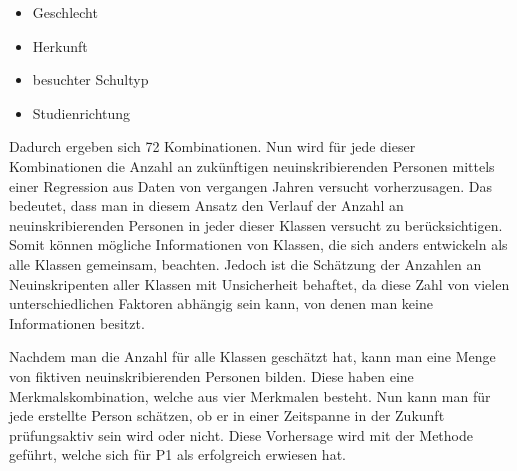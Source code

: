 \begin{itemize}
  \item Geschlecht
  \item Herkunft
  \item besuchter Schultyp
  \item Studienrichtung
\end{itemize}

Dadurch ergeben sich 72 Kombinationen. Nun wird f\"ur jede dieser Kombinationen die Anzahl an zuk\"unftigen neuinskribierenden Personen mittels einer Regression aus Daten von
vergangen Jahren versucht vorherzusagen. Das bedeutet, dass man in diesem Ansatz den Verlauf der Anzahl an neuinskribierenden Personen in jeder dieser Klassen versucht zu
ber\"ucksichtigen. Somit k\"onnen m\"ogliche Informationen von Klassen, die sich anders entwickeln als alle Klassen gemeinsam, beachten. Jedoch ist die Sch\"atzung der
Anzahlen an Neuinskripenten aller Klassen mit Unsicherheit behaftet, da diese Zahl von vielen unterschiedlichen Faktoren abh\"angig sein kann, 
von denen man keine Informationen besitzt.

Nachdem man die Anzahl f\"ur alle Klassen gesch\"atzt hat, kann man eine Menge von fiktiven neuinskribierenden Personen bilden. Diese haben eine Merkmalskombination,
welche aus vier Merkmalen besteht. Nun kann man f\"ur jede erstellte Person sch\"atzen, ob er in einer Zeitspanne in der Zukunft pr\"ufungsaktiv sein wird oder nicht.
Diese Vorhersage wird mit der Methode gef\"uhrt, welche sich f\"ur P1 als erfolgreich erwiesen hat.